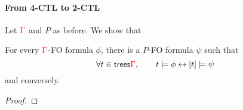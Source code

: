 \paragraph{From 4-CTL to 2-CTL}
Let ${\color{red}{\Gamma}}$ and $P$ as before. We show that
\begin{lemma}\label{lem:from-4-CTL-to-2CTL}
For every ${\color{red}{\Gamma}}$-FO formula $\phi$, there is a $P$-FO formula $\psi$ such that
$$ \forall t\in \mathsf {trees}{\color{red}{\Gamma}}, \qquad t\models \phi \leftrightarrow [t]\models \psi$$
and conversely. \end{lemma}
\begin{proof}

\end{proof}
%
%
%
%
